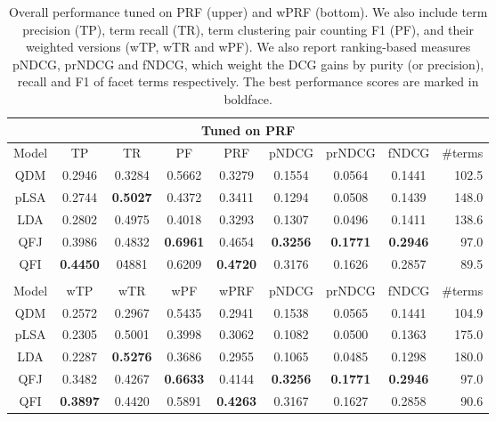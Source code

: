 \begin{table}[ht!]
\centering
\caption{Overall performance tuned on PRF (upper) and wPRF (bottom). We also include term precision (TP), term recall (TR), term clustering pair counting F1 (PF), and their weighted versions (wTP, wTR and wPF). We also report ranking-based measures pNDCG, prNDCG and fNDCG, which weight the DCG gains by purity (or precision), recall and F1 of facet terms respectively. The best performance scores are marked in boldface.}
\label{tab:intrinsic-all}
\begin{tabular}{|c|c|c|c|c|c|c|c|r|} \hline
\multicolumn{9}{|c|}{Tuned on PRF} \\\hline
Model & TP & TR & PF & PRF & pNDCG & prNDCG & fNDCG & \#terms \\ \hline
QDM & 0.2946 & 0.3284 & 0.5662 & 0.3279 & 0.1554 & 0.0564 & 0.1441 & 102.5 \\ \hline
pLSA & 0.2744 & \textbf{0.5027} & 0.4372 & 0.3411 & 0.1294 & 0.0508 & 0.1439 & 148.0 \\ \hline
LDA & 0.2802 & 0.4975 & 0.4018 & 0.3293 & 0.1307 & 0.0496 & 0.1411 & 138.6 \\ \hline
QFJ & 0.3986 & 0.4832 & \textbf{0.6961} & 0.4654 & \textbf{0.3256} & \textbf{0.1771} & \textbf{0.2946} & 97.0 \\ \hline
QFI & \textbf{0.4450} & 0\.4881 & 0.6209 & \textbf{0.4720} & 0.3176 & 0.1626 & 0.2857 & 89.5 \\ 
\hhline{|=========|}
\multicolumn{9}{|c|}{Tuned on wPRF} \\\hline
Model & wTP & wTR & wPF & wPRF & pNDCG & prNDCG & fNDCG & \#terms \\ \hline
QDM & 0.2572 & 0.2967 & 0.5435 & 0.2941 & 0.1538 & 0.0565 & 0.1441 & 104.9 \\ \hline
pLSA & 0.2305 & 0.5001 & 0.3998 & 0.3062 & 0.1082 & 0.0500 & 0.1363 & 175.0 \\ \hline
LDA & 0.2287 & \textbf{0.5276} & 0.3686 & 0.2955 & 0.1065 & 0.0485 & 0.1298 & 180.0 \\ \hline
QFJ & 0.3482 & 0.4267 & \textbf{0.6633} & 0.4144 & \textbf{0.3256} & \textbf{0.1771} & \textbf{0.2946} & 97.0 \\ \hline
QFI & \textbf{0.3897} & 0.4420 & 0.5891 & \textbf{0.4263} & 0.3167 & 0.1627 & 0.2858 & 90.6 \\ \hline
\end{tabular}
\end{table}

